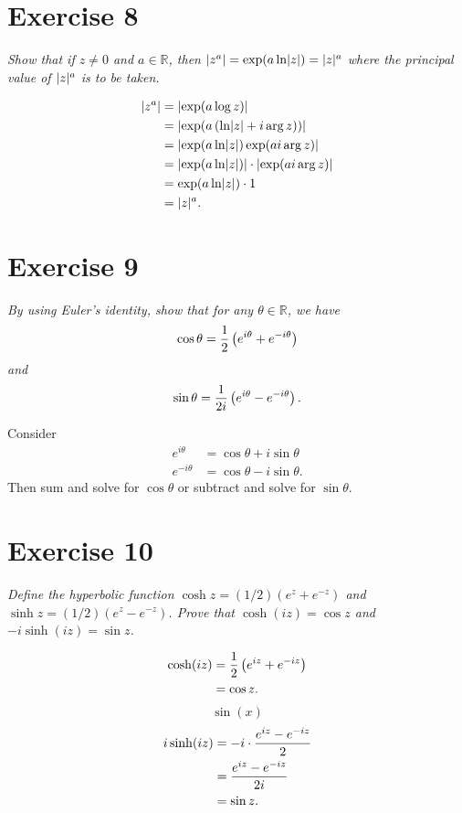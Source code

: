 \documentclass{tufte-handout}
\DeclarePairedDelimiter\abs{\lvert}{\rvert}%
\begin{document}
\section{Exercise 8}

\emph{Show that if $z \neq 0$ and $a \in \mathbb{R}$, then $\abs{z^a}
  = \exp(a \ln \abs{z}) = \abs{z}^a$ where the principal value of
  $\abs{z}^a$ is to be taken.}

\bigskip

\begin{align*}
  \abs{z^a} &= \abs{\exp(a \log z)}\\
            &= \abs{\exp(a\left( \ln \abs{z} + i \arg z \right))}\\
            &= \abs{\exp(a \ln \abs{z}) \exp(a i \arg z)}\\
            &= \abs{\exp(a \ln \abs{z})} \cdot \abs{\exp(a i \arg
              z)}\\
            &= \exp(a \ln \abs{z}) \cdot 1\\
            &= \abs{z}^a.
\end{align*}

\section{Exercise 9}

\emph{By using Euler's identity, show that for any $\theta \in
  \mathbb{R}$, we have}%
\[
\cos \theta = {1 \over 2} \left( e^{i \theta} + e^{-i \theta} \right)
\]
\emph{and}%
\[
\sin \theta = {1 \over 2i} \left( e^{i \theta} - e^{-i \theta} \right).
\]

\bigskip

Consider
\begin{align*}
  e^{i \theta}
  &= \cos \theta + i \sin \theta\\
  e^{-i \theta}
  &= \cos \theta - i \sin \theta.
\end{align*}
Then sum and solve for $\cos \theta$ or subtract and solve for $\sin
\theta$.

\section{Exercise 10}

\emph{Define the hyperbolic function $\cosh z = (1/2)(e^z + e^{-z})$
  and $\sinh z = (1/2)(e^z - e^{-z})$. Prove that $\cosh (i z) = \cos
  z$ and $-i \sinh(i z) = \sin z$.}

\bigskip

\begin{align*}
  \cosh(i z) &= {1 \over 2} \left( e^{i z} + e^{-i z} \right)\\
             &= \cos z.
\end{align*}
\[ \sin(x) \]
\begin{align*}
  i \sinh(i z) &= -i \cdot {e^{i z} - e^{-i z} \over 2}\\
               &= {e^{i z} - e^{-i z} \over 2i}\\
               &= \sin z.
\end{align*}
\end{document}
